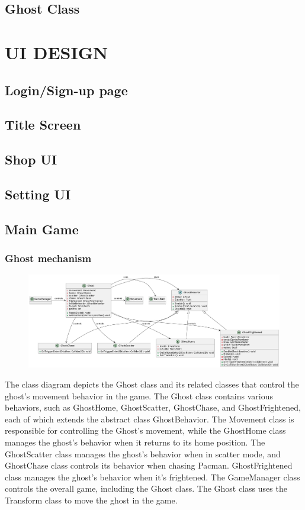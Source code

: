 \documentclass[11pt]{article}
\begin{document}
\subsection{Ghost Class}


\section{UI DESIGN}

\subsection{Login/Sign-up page}

\subsection{Title Screen}

\subsection{Shop UI}

\subsection{Setting UI}

\subsection{Main Game}

\subsubsection{Ghost mechanism}

\begin{figure}[H]
    \centering
    \includegraphics*[scale=0.4]{Ghost_Class.png}
\end{figure}

The class diagram depicts the Ghost class and its related classes that control the ghost's movement behavior in the game. The Ghost class contains various behaviors, such as GhostHome, GhostScatter, GhostChase, and GhostFrightened, each of which extends the abstract class GhostBehavior. The Movement class is responsible for controlling the Ghost's movement, while the GhostHome class manages the ghost's behavior when it returns to its home position. The GhostScatter class manages the ghost's behavior when in scatter mode, and GhostChase class controls its behavior when chasing Pacman. GhostFrightened class manages the ghost's behavior when it's frightened. The GameManager class controls the overall game, including the Ghost class. The Ghost class uses the Transform class to move the ghost in the game.
\end{document}
